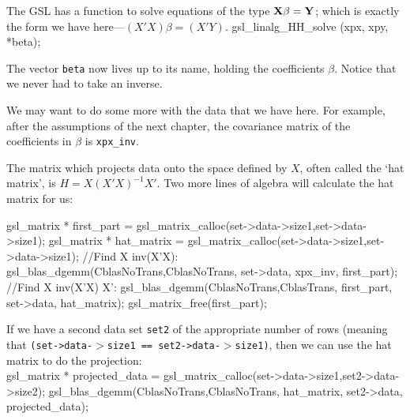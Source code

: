 The GSL has a function to solve equations of the type ${\bf X} \beta =
{\bf Y}$; which is exactly the form we have here---$(X'X)\beta = (X'Y)$.  \label{ols}
        gsl_linalg_HH_solve (xpx, xpy, *beta);

The vector {\tt beta} now lives up to its name, holding the coefficients
$\beta$. Notice that we never had to take an inverse.  

We may want to do some more with the data that we have here. For example,
after the assumptions of the next chapter, the covariance matrix of the
coefficients in $\beta$ is {\tt xpx\_inv}.

The matrix which projects data onto the space defined by $X$, often
called the `hat matrix', is $H = X(X'X)^{-1}X'$. Two more lines of algebra will calculate the hat matrix
for us:

gsl_matrix * first_part = gsl_matrix_calloc(set->data->size1,set->data->size1);
gsl_matrix * hat_matrix = gsl_matrix_calloc(set->data->size1,set->data->size1);
//Find X inv(X'X):
gsl_blas_dgemm(CblasNoTrans,CblasNoTrans, set->data, xpx_inv, first_part);	
//Find X inv(X'X) X':
gsl_blas_dgemm(CblasNoTrans,CblasTrans, first_part, set->data, hat_matrix);	
gsl_matrix_free(first_part);

If we have a second data set {\tt set2} of the appropriate number of
rows (meaning that {\tt (set->data-$>$size1 == set2->data-$>$size1)}, then we can use the hat matrix to do the projection:\\
gsl_matrix * projected_data = gsl_matrix_calloc(set->data->size1,set2->data->size2);
gsl_blas_dgemm(CblasNoTrans,CblasNoTrans, hat_matrix, set2->data, projected_data);





